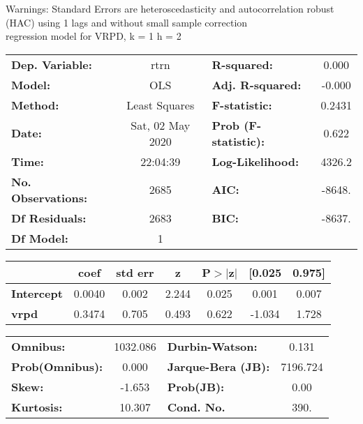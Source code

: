 Warnings: \newline
 [1] Standard Errors are heteroscedasticity and autocorrelation robust (HAC) using 1 lags and without small sample correction\\ 

regression model for VRPD, k = 1 h = 2\begin{center}
\begin{tabular}{lclc}
\toprule
\textbf{Dep. Variable:}    &       rtrn       & \textbf{  R-squared:         } &     0.000   \\
\textbf{Model:}            &       OLS        & \textbf{  Adj. R-squared:    } &    -0.000   \\
\textbf{Method:}           &  Least Squares   & \textbf{  F-statistic:       } &    0.2431   \\
\textbf{Date:}             & Sat, 02 May 2020 & \textbf{  Prob (F-statistic):} &    0.622    \\
\textbf{Time:}             &     22:04:39     & \textbf{  Log-Likelihood:    } &    4326.2   \\
\textbf{No. Observations:} &        2685      & \textbf{  AIC:               } &    -8648.   \\
\textbf{Df Residuals:}     &        2683      & \textbf{  BIC:               } &    -8637.   \\
\textbf{Df Model:}         &           1      & \textbf{                     } &             \\
\bottomrule
\end{tabular}
\begin{tabular}{lcccccc}
                   & \textbf{coef} & \textbf{std err} & \textbf{z} & \textbf{P$> |$z$|$} & \textbf{[0.025} & \textbf{0.975]}  \\
\midrule
\textbf{Intercept} &       0.0040  &        0.002     &     2.244  &         0.025        &        0.001    &        0.007     \\
\textbf{vrpd}      &       0.3474  &        0.705     &     0.493  &         0.622        &       -1.034    &        1.728     \\
\bottomrule
\end{tabular}
\begin{tabular}{lclc}
\textbf{Omnibus:}       & 1032.086 & \textbf{  Durbin-Watson:     } &    0.131  \\
\textbf{Prob(Omnibus):} &   0.000  & \textbf{  Jarque-Bera (JB):  } & 7196.724  \\
\textbf{Skew:}          &  -1.653  & \textbf{  Prob(JB):          } &     0.00  \\
\textbf{Kurtosis:}      &  10.307  & \textbf{  Cond. No.          } &     390.  \\
\bottomrule
\end{tabular}
\end{center}

